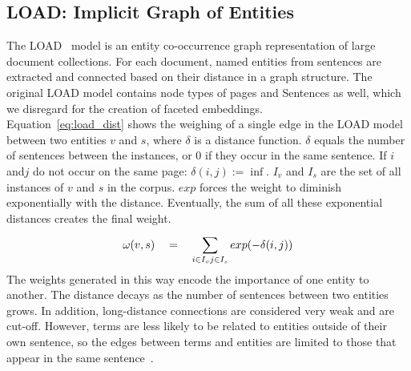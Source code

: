 \subsection{LOAD: Implicit Graph of Entities}
The LOAD~ model is an entity co-occurrence graph representation of large document collections. For each document, named entities from sentences are extracted and connected based on their distance in a graph structure. The original LOAD model contains node types of pages and Sentences as well, which we disregard for the creation of faceted embeddings. \\
Equation~\ref{eq:load_dist} shows the weighing of a single edge in the LOAD model between two entities $v$ and $s$, where $\delta $ is a distance function. $\delta $ equals the number of sentences between the
instances, or $0$ if they occur in the same sentence. If $i$ and$ j$
do not occur on the same page: $ \delta(i, j) := \inf$. $ I_{ v }$ and $I_{ s } $ are the set of all instances of $v$ and $s$ in the corpus. $exp$ forces the weight to diminish exponentially with the distance. Eventually, the sum of all these exponential distances creates the final weight. 
\begin{equation}
\omega (v,s)\quad =\quad \sum _{ i\in I_{ v } \\ j\in I_{ s } }^{  }{ exp } (-\delta (i,j))
\label{eq:load_dist}
\end{equation}
The weights generated in this way encode the importance of one entity to another. The distance decays as the number of sentences between two entities grows.  In addition, long-distance connections are considered very weak and are cut-off.  However, terms are less likely to be related to entities outside of their own sentence, so the edges between terms and entities are limited to those that appear in the same sentence~. 

